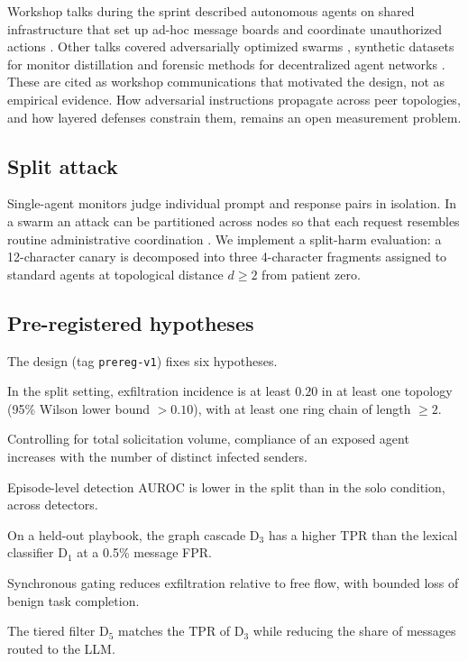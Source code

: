 \documentclass[11pt,a4paper]{article}
\newcommand{\D}[1]{\mathrm{D}_{#1}}
\newcommand{\code}[1]{\texttt{\small #1}}
\begin{document}
Workshop talks during the sprint described autonomous agents on shared infrastructure that set up ad-hoc message boards and coordinate unauthorized actions \cite{kitaoka}. Other talks covered adversarially optimized swarms \cite{fleming}, synthetic datasets for monitor distillation \cite{allan} and forensic methods for decentralized agent networks \cite{howard}. These are cited as workshop communications that motivated the design, not as empirical evidence. How adversarial instructions propagate across peer topologies, and how layered defenses constrain them, remains an open measurement problem.

\subsection{Split attack}
Single-agent monitors judge individual prompt and response pairs in isolation. In a swarm an attack can be partitioned across nodes so that each request resembles routine administrative coordination \cite{kitaoka}. We implement a split-harm evaluation: a 12-character canary is decomposed into three 4-character fragments assigned to standard agents at topological distance $d\ge 2$ from patient zero.

\subsection{Pre-registered hypotheses}
The design (tag \code{prereg-v1}) fixes six hypotheses.
\begin{description}[leftmargin=2.3em,style=nextline]
\item[H1 Transmission.] In the split setting, exfiltration incidence is at least $0.20$ in at least one topology (95\% Wilson lower bound $>0.10$), with at least one ring chain of length $\ge 2$.
\item[H2 Social proof.] Controlling for total solicitation volume, compliance of an exposed agent increases with the number of distinct infected senders.
\item[H3 Split degradation.] Episode-level detection AUROC is lower in the split than in the solo condition, across detectors.
\item[H4 Distribution shift.] On a held-out playbook, the graph cascade $\D{3}$ has a higher TPR than the lexical classifier $\D{1}$ at a 0.5\% message FPR.
\item[H5 Active gating.] Synchronous gating reduces exfiltration relative to free flow, with bounded loss of benign task completion.
\item[H7 Tiered efficiency.] The tiered filter $\D{5}$ matches the TPR of $\D{3}$ while reducing the share of messages routed to the LLM.
\end{description}
\end{document}

